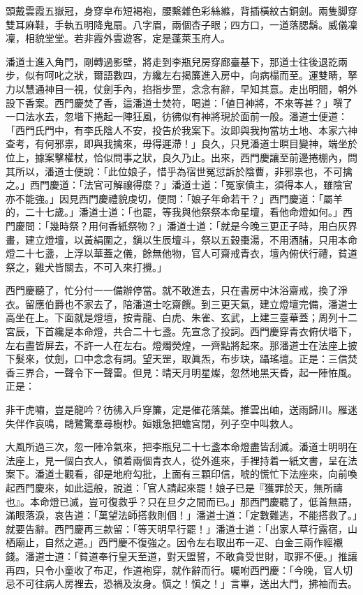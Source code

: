 \begin{myquote}
頭戴雲霞五嶽冠，身穿皁布短褐袍，腰繫雜色彩絲縧，背插橫紋古銅劍。兩隻脚穿雙耳麻鞋，手執五明降鬼扇。八字眉，兩個杏子眼；四方口，一道落腮鬍。威儀凜凜，相貌堂堂。若非霞外雲遊客，定是蓬萊玉府人。
\end{myquote}

潘道士進入角門，剛轉過影壁，將走到李瓶兒房穿廊臺基下，那道士往後退訖兩步，似有呵叱之狀，爾語數四，方纔左右揭簾進入房中，向病榻而至。運雙睛，拏力以慧通神目一視，仗劍手內，掐指步罡，念念有辭，早知其意。{}走出明間，朝外設下香案。西門慶焚了香，這潘道士焚符，喝道：「値日神將，不來等甚？」噀了一口法水去，忽堦下捲起一陣狂風，彷彿似有神將現於面前一般。潘道士便道：「西門氏門中，有李氏陰人不安，投告於我案下。汝即與我拘當坊土地、本家六神查考，有何邪祟，即與我擒來，毋得遲滯！」良久，只見潘道士瞑目變神，端坐於位上，據案擊權杖，恰似問事之狀，{}良久乃止。出來，西門慶讓至前邊捲棚內，問其所以，潘道士便說：「此位娘子，惜乎為宿世冤愆訴於陰曹，非邪祟也，不可擒之。」西門慶道：「法官可解禳得麼？」潘道士道：「冤家債主，須得本人，雖陰官亦不能強。」{}因見西門慶禮貌虔切，便問：「娘子年命若干？」西門慶道：「屬羊的，二十七歲。」潘道士道：「也罷，等我與他祭祭本命星壇，看他命燈如何。」西門慶問：「幾時祭？用何香紙祭物？」潘道士道：「就是今晚三更正子時，用白灰界畫，建立燈壇，以黃絹圍之，鎭以生辰壇斗，祭以五穀棗湯，不用酒脯，只用本命燈二十七盞，上浮以華蓋之儀，餘無他物，官人可齋戒青衣，壇內俯伏行禮，貧道祭之，雞犬皆關去，不可入來打攪。」

西門慶聽了，忙分付一一備辦停當。就不敢進去，只在書房中沐浴齋戒，換了淨衣。留應伯爵也不家去了，陪潘道士吃齋饌。到三更天氣，建立燈壇完備，潘道士高坐在上。下面就是燈壇，按青龍、白虎、朱雀、玄武，上建三臺華蓋；周列十二宮辰，下首纔是本命燈，共合二十七盞。先宣念了投詞。西門慶穿青衣俯伏堦下，左右盡皆屏去，不許一人在左右。燈燭熒煌，一齊點將起來。那潘道士在法座上披下髮來，仗劍，口中念念有詞。望天罡，取眞炁，布步玦，躡瑤壇。正是：三信焚香三界合，一聲令下一聲雷。但見：晴天月明星燦，忽然地黑天昏，起一陣恠風。正是：

\begin{myquote}
非干虎嘯，豈是龍吟？彷彿入戶穿簾，定是催花落葉。推雲出岫，送雨歸川。雁迷失伴作哀鳴，鷗鷺驚羣尋樹杪。姮娥急把蟾宮閉，列子空中叫救人。
\end{myquote}

大風所過三次，忽一陣冷氣來，把李瓶兒二十七盞本命燈盡皆刮滅。潘道士明明在法座上，見一個白衣人，領着兩個青衣人，從外進來，手裡持着一紙文書，呈在法案下。潘道士觀看，卻是地府勾批，上面有三顆印信，唬的慌忙下法座來，向前喚起西門慶來，如此這般，說道：「官人請起來罷！娘子已是『獲罪於天，無所禱也』。本命燈已滅，豈可復救乎？只在旦夕之間而已。」那西門慶聽了，低首無語，滿眼落淚，哀告道：「萬望法師搭救則個！」{}潘道士道：「定數難逃，不能搭救了。」就要告辭。西門慶再三款留：「等天明早行罷！」潘道士道：「出家人草行露宿，山栖廟止，自然之道。」西門慶不復強之。因令左右取出布一疋、白金三兩作經襯錢。潘道士道：「貧道奉行皇天至道，對天盟誓，不敢貪受世財，取罪不便。」推讓再四，只令小童收了布疋，作道袍穿，就作辭而行。囑咐西門慶：「今晚，官人切忌不可往病人房裡去，恐禍及汝身。愼之！愼之！」言畢，送出大門，拂袖而去。

